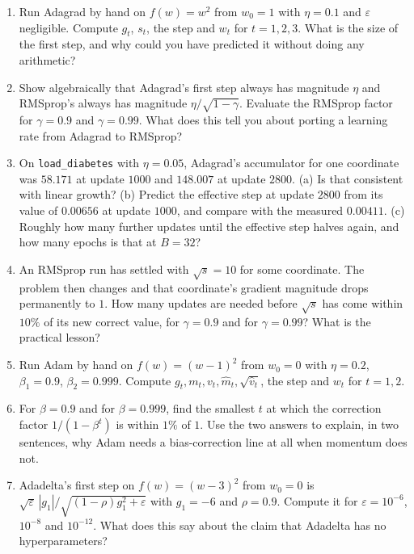 \documentclass[11pt]{article}
\begin{document}
\begin{enumerate}[leftmargin=*]
  \item\label{q:ada} Run Adagrad by hand on $f(w) = w^2$ from $w_0 = 1$ with
    $\eta = 0.1$ and $\varepsilon$ negligible. Compute $g_t$, $s_t$, the step
    and $w_t$ for $t = 1, 2, 3$. What is the size of the first step, and why
    could you have predicted it without doing any arithmetic?

  \item Show algebraically that Adagrad's first step always has magnitude
    $\eta$ and RMSprop's always has magnitude $\eta/\sqrt{1-\gamma}$. Evaluate
    the RMSprop factor for $\gamma = 0.9$ and $\gamma = 0.99$. What does this
    tell you about porting a learning rate from Adagrad to RMSprop?

  \item\label{q:decay} On \texttt{load\_diabetes} with $\eta = 0.05$, Adagrad's
    accumulator for one coordinate was $58.171$ at update $1000$ and $148.007$
    at update $2800$. (a) Is that consistent with linear growth? (b) Predict the
    effective step at update $2800$ from its value of $0.00656$ at update
    $1000$, and compare with the measured $0.00411$. (c) Roughly how many
    further updates until the effective step halves again, and how many epochs
    is that at $B = 32$?

  \item\label{q:mem} An RMSprop run has settled with $\sqrt{s} = 10$ for some
    coordinate. The problem then changes and that coordinate's gradient
    magnitude drops permanently to $1$. How many updates are needed before
    $\sqrt{s}$ has come within $10\%$ of its new correct value, for
    $\gamma = 0.9$ and for $\gamma = 0.99$? What is the practical lesson?

  \item\label{q:adam} Run Adam by hand on $f(w) = (w-1)^2$ from $w_0 = 0$ with
    $\eta = 0.2$, $\beta_1 = 0.9$, $\beta_2 = 0.999$. Compute
    $g_t, m_t, v_t, \hat m_t, \sqrt{\hat v_t}$, the step and $w_t$ for
    $t = 1, 2$.

  \item\label{q:bias} For $\beta = 0.9$ and for $\beta = 0.999$, find the
    smallest $t$ at which the correction factor $1/(1-\beta^t)$ is within $1\%$
    of $1$. Use the two answers to explain, in two sentences, why Adam needs a
    bias-correction line at all when momentum does not.

  \item\label{q:eps} Adadelta's first step on $f(w) = (w-3)^2$ from $w_0 = 0$
    is $\sqrt{\varepsilon}\,|g_1|/\sqrt{(1-\rho)g_1^2 + \varepsilon}$ with
    $g_1 = -6$ and $\rho = 0.9$. Compute it for $\varepsilon = 10^{-6}$,
    $10^{-8}$ and $10^{-12}$. What does this say about the claim that Adadelta
    has no hyperparameters?


\end{enumerate}
\end{document}
